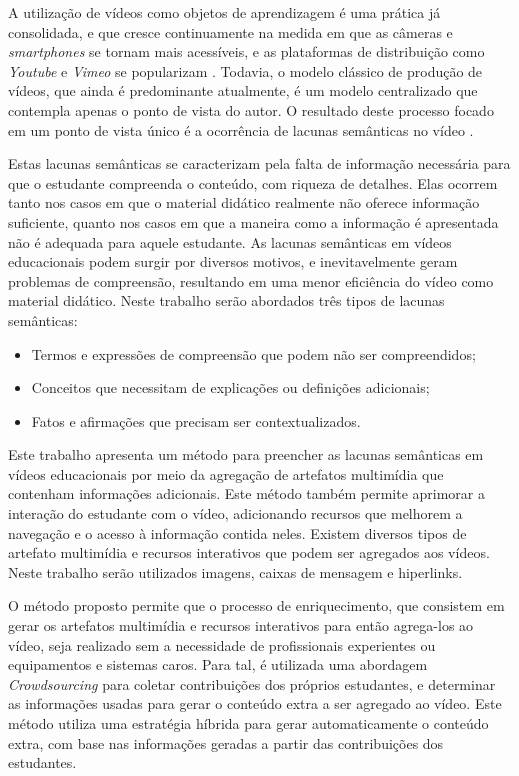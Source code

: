 A utilização de vídeos como objetos de aprendizagem é uma prática já consolidada, e que cresce continuamente na medida em que as câmeras e \textit{smartphones} se tornam mais acessíveis, e as plataformas de distribuição como \textit{Youtube} e \textit{Vimeo} se popularizam  \cite{Davis:2015:YoutubeVimeo}. Todavia, o modelo clássico de produção de vídeos, que ainda é predominante atualmente, é um modelo centralizado que contempla apenas o ponto de vista do autor. O resultado deste processo focado em um ponto de vista único é a ocorrência de lacunas semânticas no vídeo \cite{Bhimani:2013:VPE:2465958.2465976}. 

Estas lacunas semânticas se caracterizam pela falta de informação necessária para que o estudante compreenda o conteúdo, com riqueza de detalhes. Elas ocorrem tanto nos casos em que o material didático realmente não oferece informação suficiente, quanto nos casos em que a maneira como a informação é apresentada não é adequada para aquele estudante. As lacunas semânticas em vídeos educacionais podem surgir por diversos motivos, e inevitavelmente geram problemas de compreensão, resultando em uma menor eficiência do vídeo como material didático. Neste trabalho serão abordados três tipos de lacunas semânticas: 
\begin{itemize}
    \item Termos e expressões de compreensão que podem não ser compreendidos;
    \item Conceitos que necessitam de explicações ou definições adicionais;
    \item Fatos e afirmações que precisam ser contextualizados.
\end{itemize}


Este trabalho apresenta um método para preencher as lacunas semânticas em vídeos educacionais por meio da agregação de artefatos multimídia que contenham informações adicionais. Este método também permite aprimorar a interação do estudante com o vídeo, adicionando recursos que melhorem a navegação e o acesso à informação contida neles. Existem diversos tipos de artefato multimídia e recursos interativos que podem ser agregados aos vídeos. Neste trabalho serão utilizados imagens, caixas de mensagem e hiperlinks.

O método proposto permite que o processo de enriquecimento, que consistem em gerar os artefatos multimídia e recursos interativos para então agrega-los ao vídeo, seja realizado sem a necessidade de profissionais experientes ou equipamentos e sistemas caros. Para tal, é utilizada uma abordagem \textit{Crowdsourcing} \cite{Howe2006} para coletar contribuições dos próprios estudantes, e determinar as informações usadas para gerar o conteúdo extra a ser agregado ao vídeo. Este método utiliza uma estratégia híbrida para gerar automaticamente o conteúdo extra, com base nas informações geradas a partir das contribuições dos estudantes.

